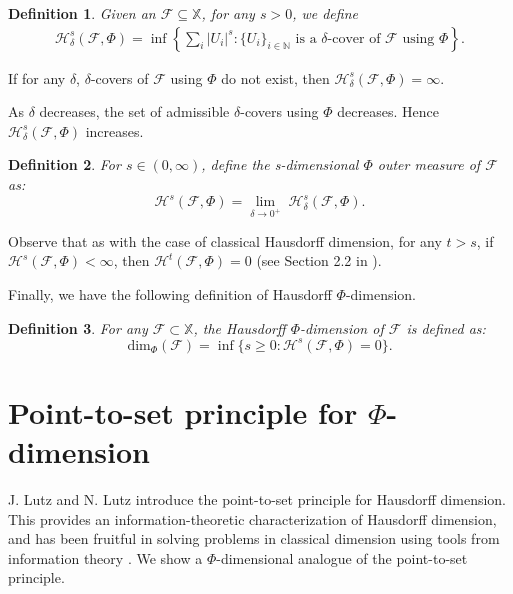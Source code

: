 \documentclass[11pt]{article}
\newtheorem{definition}{Definition}
\newcommand{\N}{\mathbb{N}}
\renewcommand{\dim}{{\mathrm{dim}}}
\newcommand{\F}{{\mathcal{F}}}
\newcommand{\X}{{\mathbb{X}}}
\renewcommand{\F}{\mathcal{F}}
\begin{document}
\begin{definition} 
	Given an $\F \subseteq \X$, for any $s>0$, we define
	\begin{align*}
		\mathcal{H}^s_\delta(\F, \Phi) = \inf\left\{\sum_i |U_i|^s :
		\{U_i\}_{i\in\N} \text{ is a } \delta\text{-cover of } \F
		\text{ using } \Phi\right\}.
	\end{align*}
\end{definition}

If for any $\delta$, $\delta$-covers of $\F$ using $\Phi$ do not exist, then $\mathcal{H}^s_\delta(\F, \Phi) = \infty$.

As $\delta$ decreases, the set of admissible $\delta$-covers using $\Phi$ decreases. Hence $\mathcal{H}^s_\delta(\F, \Phi)$ increases.

\begin{definition} 
	For $s \in (0,\infty)$, define the \emph{s-dimensional $\Phi$ outer 
		measure} of $\F$ as:
	$$\mathcal{H}^s(\F, \Phi) = \lim\limits_{\delta \rightarrow 0^+}
	\; \mathcal{H}^s_\delta(\F, \Phi).$$
\end{definition}


Observe that as with the case of classical Hausdorff dimension, for
any $t>s$, if $\mathcal{H}^s(\F, \Phi) < \infty$, then
$\mathcal{H}^t(\F, \Phi) = 0$ (see Section 2.2 in \cite{Falc03}).

Finally, we have the following definition of Hausdorff
$\Phi$-dimension.


\begin{definition} 
	For any $\F \subset \X$, the \emph{Hausdorff $\Phi$-dimension} of $\F$ is defined as:
	$$\dim_\Phi(\F) = \inf \{s\geq 0 : \mathcal{H}^s(\F, \Phi) = 0 \}
	.$$
\end{definition}



\section{Point-to-set principle for $\Phi$-dimension}  \label{sec:PSP}
J. Lutz and N. Lutz \cite{Lutz2018} introduce the point-to-set principle for Hausdorff dimension. 
This provides an information-theoretic characterization of Hausdorff dimension, and has been fruitful in solving problems in classical dimension using tools from information theory  \cite{Lutz2020}. We show a $\Phi$-dimensional analogue of the point-to-set principle.
\end{document}
